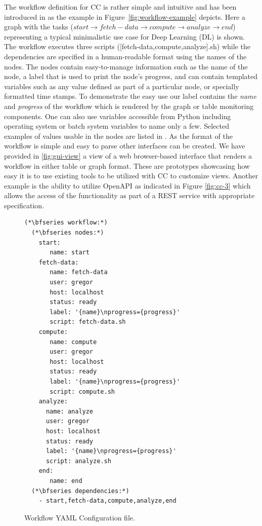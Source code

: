 \documentclass[utf8]{FrontiersinVancouver} %
\begin{document}
The workflow definition for CC is rather simple and
intuitive and has been introduced in \cite{las-2022-templated} as the example in  Figure~\ref{fig:workflow-example} depicts. Here a graph
with the tasks ($start \rightarrow f\!etch\!-\!data
\rightarrow compute \rightarrow analyze \rightarrow end$) representing a typical minimalistic use case for Deep Learning (DL) is shown. The workflow
 executes three scripts ([fetch-data,compute,analyze].sh) while the dependencies are specified in a human-readable format using the names of the nodes. The nodes contain easy-to-manage information such as the name of the node, a label that is used to print the node's progress, and can contain templated variables such as any value defined as part of a particular node, or specially formatted time stamps. To demonstrate the easy use our label contains the {\em name} and {\em progress} of the workflow which is rendered by the graph or table monitoring components. One can also use variables accessible from Python including operating system or batch system variables to name only a few. Selected examples of values usable in the nodes are listed in \citep{las-2022-templated}.
As the format of the workflow is simple and easy to parse other interfaces can be created. We have provided in \ref{fig:gui-view} a view of a web browser-based interface that renders a workflow in either table or graph format. These are prototypes showcasing how easy it is to use existing tools to be utilized with CC to customize views. Another example is the ability to utilize OpenAPI as indicated in 
Figure \ref{fig:cc-3}  which allows the access of the functionality as part of a REST service with appropriate specification. 


\begin{figure}[htb]
\vspace{-0.4cm} 
\begin{lstlisting}[breaklines=true]
(*\bfseries workflow:*)
  (*\bfseries nodes:*)
    start:
       name: start
    fetch-data:
       name: fetch-data
       user: gregor
       host: localhost
       status: ready
       label: '{name}\nprogress={progress}'
       script: fetch-data.sh
    compute:
       name: compute
       user: gregor
       host: localhost
       status: ready
       label: '{name}\nprogress={progress}'
       script: compute.sh
    analyze:
      name: analyze
      user: gregor
      host: localhost
      status: ready
      label: '{name}\nprogress={progress}'
      script: analyze.sh
    end:
       name: end
  (*\bfseries dependencies:*)
    - start,fetch-data,compute,analyze,end
\end{lstlisting}
\vspace{-0.4cm}
\caption{Workflow YAML Configuration file.}\label{fig:workflow-example}
\label{fig:yaml-file}
\end{figure}
\end{document}
